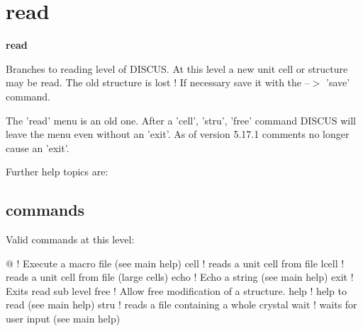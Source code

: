 \section{read}
{\bf read \par }
\par
\vspace{3pt}
Branches to reading level of DISCUS. At this level a new unit cell 
or structure may be read. The old structure is lost ! If necessary 
save it with the --$> $ 'save' command. 
\par
The 'read' menu is an old one. After a 'cell', 'stru', 'free' 
command DISCUS will leave the menu even without an 'exit'. 
As of version 5.17.1 comments no longer cause an 'exit'. 
\par
Further help topics are: 
\par
\subsection*{commands}
Valid commands at this level: 
\par
\begin{MacVerbatim}
@       ! Execute a macro file (see main help)
cell    ! reads a unit cell from file
lcell   ! reads a unit cell from file (large cells)
echo    ! Echo a string (see main help)
exit    ! Exits read sub level
free    ! Allow free modification of a structure.
help    ! help to read (see main help)
stru    ! reads a file containing a whole crystal
wait    ! waits for user input (see main help)
\end{MacVerbatim}
